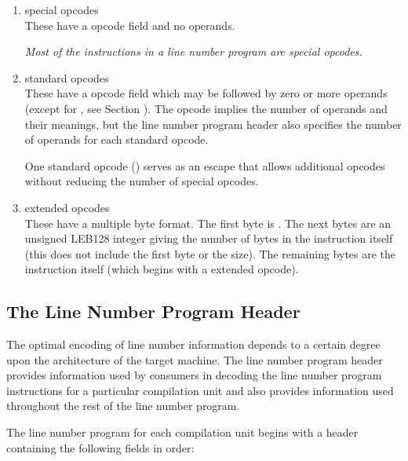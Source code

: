 \begin{enumerate}[1. ]
\item special opcodes \\
These have a \HFTubyte{} opcode field and no operands.\vspace{1ex}

\textit{Most of the instructions in a 
line number program are special opcodes.}

\item standard opcodes \\
These have a \HFTubyte{} opcode field which may be followed by zero or more
 operands (except for 
\mbox{\DWLNSfixedadvancepc,} see 
Section ).
The opcode implies the number of operands and their meanings, but the
line number program header also specifies the number of operands for
each standard opcode.

\bb
One standard opcode (\DWLNSextendedop) serves as an escape that allows
additional opcodes without reducing the number of special opcodes.
\eb

\item extended opcodes \\
These have a multiple byte format. The first byte is 
\bb
\DWLNSextendedop{}.
\eb
The next bytes
are an unsigned LEB128 integer giving the number of bytes in the
instruction itself (this does not include the first 
\bb
\DWLNSextendedop{}
\eb
byte or the size). The
remaining bytes are the instruction itself (which begins with a \HFTubyte{}
extended opcode). \\

\end{enumerate}

\subsection{The Line Number Program Header}
\label{chap:thelinenumberprogramheader}
The optimal encoding of line number information depends to a
certain degree upon the architecture of the target machine. The
line number program header provides information used by
consumers in decoding the line number program instructions for
a particular compilation unit and also provides information
used throughout the rest of the line number program.

The line number program for each compilation unit begins with
a header containing the following fields in order:

